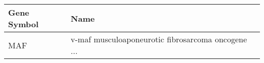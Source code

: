 \begin{tabular}{ll}
\toprule
Gene Symbol &                                               Name \\
\midrule
        MAF & v-maf musculoaponeurotic fibrosarcoma oncogene ... \\
\bottomrule
\end{tabular}
